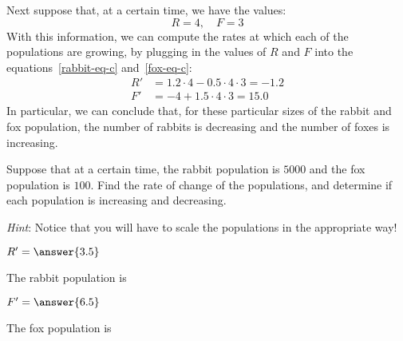\documentclass{ximera}
\begin{document}
Next suppose that, at a certain time, we have the values:
\[
R=4,\quad F=3
\]
With this information, we can compute the rates at which each of the populations are growing, by plugging in the values of $R$ and $F$ into the equations~\ref{rabbit-eq-c} and~\ref{fox-eq-c}:
\begin{align*}
R'&=1.2\cdot 4 - 0.5\cdot 4\cdot 3=-1.2\\
F'&=-4 + 1.5\cdot 4\cdot 3=15.0
\end{align*}
In particular, we can conclude that, for these particular sizes of the rabbit and fox population, the number of rabbits is decreasing and the number of foxes is increasing.

\begin{problem} Suppose that at a certain time, the rabbit population is  $5000$ and the fox population is $100$. Find the rate of change of the populations, and determine if each population is increasing and decreasing.

\emph{Hint}: Notice that you will have to scale the populations in the appropriate way!

\begin{question}
$R'= \answer{3.5}$

The rabbit population is 
\begin{multipleChoice}
\end{multipleChoice}
\end{question}
\begin{question}
$F'= \answer{6.5}$

The fox population is 
\begin{multipleChoice}
\end{multipleChoice}
\end{question}
\end{problem}
\end{document}
